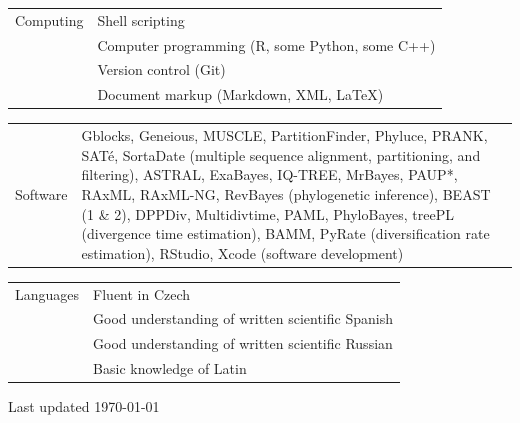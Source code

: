\documentclass[10pt]{article}
\begin{document}
\begin{tabularx}{\textwidth}{>{\raggedleft\arraybackslash}p{2.2cm} X}
Computing & Shell scripting \\
& Computer programming (\textsf{R}, some \textsf{Python}, some \textsf{C++}) \\
& Version control (\textsf{Git}) \\
& Document markup (Markdown, XML, \LaTeX)
\end{tabularx}
\begin{tabularx}{\textwidth}{>{\raggedleft\arraybackslash}p{2.2cm} X}
Software & \textsf{Gblocks}, \textsf{Geneious}, \textsf{MUSCLE},  \textsf{PartitionFinder}, \textsf{Phyluce}, \textsf{PRANK}, \textsf{SAT\'{e}}, \textsf{SortaDate} (multiple sequence alignment, partitioning, and filtering), \textsf{ASTRAL}, \textsf{ExaBayes}, \textsf{IQ-TREE}, \textsf{MrBayes}, \textsf{PAUP*}, \textsf{RAxML}, \textsf{RAxML-NG}, \textsf{RevBayes} (phylogenetic inference), \textsf{BEAST (1 \& 2)}, \textsf{DPPDiv}, \textsf{Multidivtime}, \textsf{PAML}, \textsf{PhyloBayes}, \textsf{treePL} (divergence time estimation), \textsf{BAMM}, \textsf{PyRate} (diversification rate estimation), \textsf{RStudio}, \textsf{Xcode} (software development)
\end{tabularx}
\begin{tabularx}{\textwidth}{>{\raggedleft\arraybackslash}p{2.2cm} X}
Languages & Fluent in Czech \\
& Good understanding of written scientific Spanish \\
& Good understanding of written scientific Russian \\
& Basic knowledge of Latin
\end{tabularx}

\vspace*{1cm}

\noindent \begin{minipage}{16.51cm}
\begin{center}
Last updated \today
\end{center}
\end{minipage}
\end{document}
